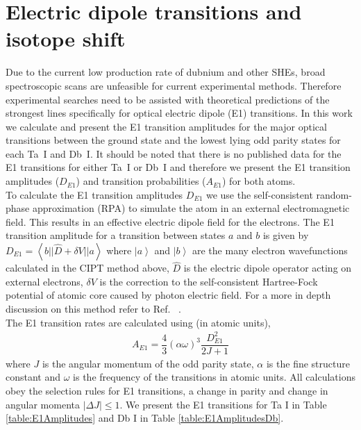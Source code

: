 \documentclass[10pt,a4paper, twoside, openright]{report}
\begin{document}
\section{Electric dipole transitions and isotope shift} \label{sec:E1transitions}
Due to the current low production rate of dubnium and other SHEs, broad spectroscopic scans are unfeasible for current experimental methods. Therefore experimental searches need to be assisted with theoretical predictions of the strongest lines specifically for optical electric dipole (E1) transitions. In this work we calculate and present the E1 transition amplitudes for the major optical  transitions between the ground state and the  lowest lying odd parity states for each Ta~I and Db~I. It should be noted that there is no published data for the E1 transitions for either Ta~I or Db~I and therefore we present the E1 transition amplitudes ($D_{E1}$)  and transition probabilities ($A_{E1}$) for both atoms. \\
\linebreak
To calculate the E1 transition amplitudes $D_{E1}$ we use the self-consistent random-phase approximation (RPA) to simulate the atom in an external electromagnetic field. This results in an effective electric dipole field for the electrons. The E1 transition amplitude for a transition between states $a$ and $b$ is given by $D_{E1} = \left< b || \hat D + \delta V || a\right>$ where $\left|a\right>$ and $\left|b\right>$ are the many electron wavefunctions calculated in the CIPT method above, $\hat D$ is the electric dipole operator acting on external electrons, $\delta V$ is the correction to the self-consistent Hartree-Fock potential of atomic core caused by photon electric field. For a more in depth discussion on this method refer to Ref. ~\cite{Dzuba2018}. \\
\linebreak
The E1 transition rates are calculated using (in atomic units),
\begin{align*}
A_{E1} = \dfrac{4}{3}\left(\alpha \omega\right)^3\dfrac{ D_{E1}^2}{2J + 1}
\end{align*}
where $J$ is the angular momentum of the odd parity state, $\alpha$ is the fine structure constant and $\omega$ is the frequency of the transitions in atomic units. All calculations obey the selection rules for E1 transitions, a change in parity and change in angular momenta $|\Delta J| \leq 1 $. We present the E1 transitions for Ta I in Table \ref{table:E1Amplitudes} and Db I in Table \ref{table:E1AmplitudesDb}.\\
\end{document}
